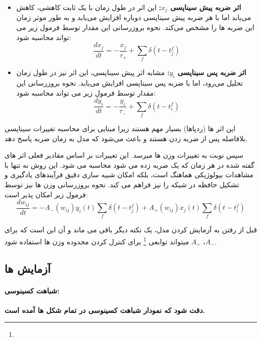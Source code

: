         \begin{itemize}
            \item \textbf{اثر ضربه پیش سیناپسی $x_j$:}
                این اثر در طول زمان با یک ثابت کاهشی، کاهش می‌یابد اما با هر ضربه پیش سیناپسی دوباره افزایش می‌یابد و به طور موثر زمان این ضربه ها را مشخص می‌کند. نحوه بروزرسانی این مقدار توسط فرمول زیر می تواند محاسبه شود:
                \begin{equation}
                    \frac{dx_j}{dt} = -\frac{x_j}{\tau_+} + \sum_{f}\delta(t-t_{j}^{f})
                \end{equation}
            \item \textbf{اثر ضربه پس سیناپسی $y_i$:}
            مشابه اثر پیش سیناپسی، این اثر نیز در طول زمان تحلیل می‌رود، اما با ضربه پس سیناپسی افزایش می‌یابد.  نحوه بروزرسانی این مقدار توسط فرمول زیر می تواند محاسبه شود:
            \begin{equation}
                \frac{dy_i}{dt} = -\frac{y_i}{\tau_-} + \sum_{f}\delta(t-t_{i}^{f})
            \end{equation}
        \end{itemize}

        این اثر ها
        (ردپاها)
        بسیار مهم هستند زیرا مبنایی برای محاسبه تغییرات سیناپسی بلافاصله پس از ضربه زدن هستند و باعث می‌شود که مدل به زمان ضربه پاسخ دهد.

        سپس نوبت به تغییرات وزن ها میرسد. این تغییرات بر اساس مقادیر فعلی اثر های گفته شده در هر زمان که یک ضربه زده می شود محاسبه می شود. این روش نه تنها با مشاهدات بیولوژیکی هماهنگ است، بلکه امکان شبیه سازی دقیق فرآیندهای یادگیری و تشکیل حافظه در شبکه را نیز فراهم می کند. نحوه بروزرسانی وزن ها نیز توسط فرمول زیر امکان پذیر است:
        \begin{equation}
            \frac{dw_{ij}}{dt} = -A_{-}(w_{ij})y_{i}(t)\sum_{f}\delta(t-t^{f}_{j})+A_{+}(w_{ij})x_{j}(t)\sum_{f}\delta(t-t^{f}_{i})
        \end{equation}

        قبل از رفتن به آزمایش کردن مدل، یک نکته دیگر باقی می ماند و آن این است که برای 
        $A_{-}$، $A_{+}$ 
        میتواند توابعی
        \footnote{}
        برای کنترل کردن محدوده وزن ها استفاده شود.
        
        
    \subsection{آزمایش ها}
        \paragraph*{شباهت کسینوسی:}
            \textbf{ دقت شود که نمودار شباهت کسینوسی در تمام شکل ها آمده است.}

